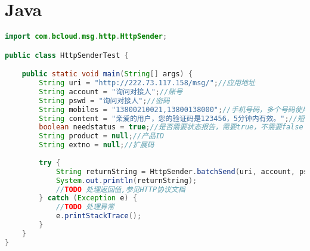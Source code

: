 \documentclass[11pt]{book} %
\begin{document}
\section{Java}

\begin{lstlisting}[language=Java]
import com.bcloud.msg.http.HttpSender;

public class HttpSenderTest {

	public static void main(String[] args) {
		String uri = "http://222.73.117.158/msg/";//应用地址
		String account = "询问对接人";//账号
		String pswd = "询问对接人";//密码
		String mobiles = "13800210021,13800138000";//手机号码，多个号码使用","分割
		String content = "亲爱的用户，您的验证码是123456，5分钟内有效。";//短信内容
		boolean needstatus = true;//是否需要状态报告，需要true，不需要false
		String product = null;//产品ID
		String extno = null;//扩展码
		 
		try {
			String returnString = HttpSender.batchSend(uri, account, pswd, mobiles, content, needstatus, product, extno);
			System.out.println(returnString);
			//TODO 处理返回值,参见HTTP协议文档
		} catch (Exception e) {
			//TODO 处理异常
			e.printStackTrace();
		}
	}
}
\end{lstlisting}
\end{document}
